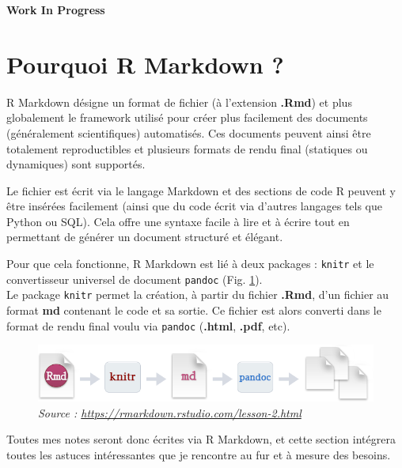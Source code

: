 \documentclass[
  french,
]{book}
\newenvironment{infobox}[1]
  {
  \begin{itemize}
  \renewcommand{\labelitemi}{
    \raisebox{-.7\height}[0pt][0pt]{
      {\setkeys{Gin}{width=3em,keepaspectratio}
        \texttt{[image: images/\#1]}}
    }
  }
  \setlength{\fboxsep}{1em}
  \begin{blackbox}
  \item
  }
  {
  \end{blackbox}
  \end{itemize}
  }
\begin{document}
\begin{infobox}{caution}

\textbf{Work In Progress}

\end{infobox}

\hypertarget{pourquoi-rmarkdown}{%
\section{Pourquoi R Markdown ?}\label{pourquoi-rmarkdown}}

R Markdown désigne un format de fichier (à l'extension \textbf{.Rmd}) et plus
globalement le framework utilisé pour créer plus facilement des documents
(généralement scientifiques) automatisés. Ces documents peuvent ainsi être
totalement reproductibles et plusieurs formats de rendu final (statiques ou
dynamiques) sont supportés.

Le fichier est écrit via le langage Markdown et des sections de code R peuvent y
être insérées facilement (ainsi que du code écrit via d'autres langages tels
que Python ou SQL). Cela offre une syntaxe facile à lire et à écrire tout en
permettant de générer un document structuré et élégant.

Pour que cela fonctionne, R Markdown est lié à deux packages : \texttt{knitr} et le
convertisseur universel de document \texttt{pandoc} (Fig. \ref{fig:rmarkdownflow}).\\
Le package \texttt{knitr} permet la création, à partir du fichier \textbf{.Rmd}, d'un fichier
au format \textbf{md} contenant le code et sa sortie. Ce fichier est alors converti
dans le format de rendu final voulu via \texttt{pandoc} (\textbf{.html}, \textbf{.pdf}, etc).



\begin{figure}

{\centering \includegraphics[width=0.6\linewidth]{images/rmarkdownflow} 

}

\caption{\emph{Source : \url{https://rmarkdown.rstudio.com/lesson-2.html}}}\label{fig:rmarkdownflow}
\end{figure}

Toutes mes notes seront donc écrites via R Markdown, et cette section intégrera
toutes les astuces intéressantes que je rencontre au fur et à mesure des
besoins.
\end{document}
